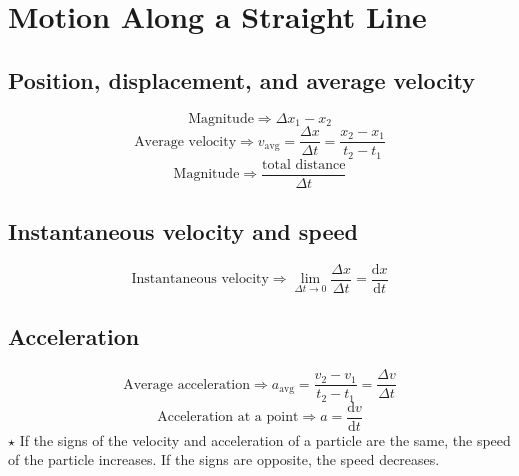 \section{Motion Along a Straight Line}

\subsection{Position, displacement, and average velocity}

\begin{equation*}
    \textrm{Magnitude} \Rightarrow \Delta x_1 - x_2
\end{equation*}
\begin{equation*}
    \textrm{Average velocity} \Rightarrow v_\textrm{avg} = \frac{\Delta x}{\Delta t} = \frac{x_2 - x_1}{t_2 - t_1}
\end{equation*}
\begin{equation*}
    \textrm{Magnitude} \Rightarrow \frac{\textrm{total distance}}{\Delta t}
\end{equation*}

\subsection{Instantaneous velocity and speed}

\begin{equation*}
    \textrm{Instantaneous velocity} \Rightarrow \lim_{\Delta t \to 0} \frac{\Delta x}{\Delta t} = \frac{\mathrm{d}x}{\mathrm{d}t}
\end{equation*}

\subsection{Acceleration}
\begin{equation*}
    \textrm{Average acceleration} \Rightarrow a_{\text{avg}} = \frac{v_2 - v_1}{t_2 - t_1} = \frac{\Delta v}{\Delta t}
\end{equation*}
\begin{equation*}
    \textrm{Acceleration at a point} \Rightarrow a = \frac{\mathrm{d}v}{\mathrm{d}t}
\end{equation*}
\noindent $\star$ If the signs of the velocity and acceleration of a particle are the same, the speed
of the particle increases. If the signs are opposite, the speed decreases.

